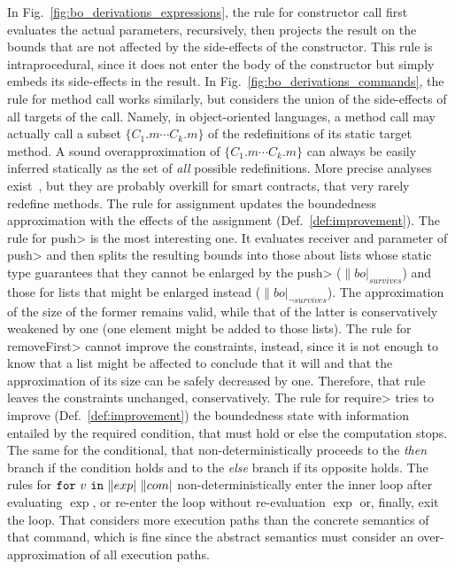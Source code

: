 %
In Fig.~\ref{fig:bo_derivations_expressions}, the
rule for constructor call first evaluates
the actual parameters, recursively, then projects the result on the bounds
that are not affected by the side-effects of the constructor. This
rule is intraprocedural, since it does not enter the body of the constructor
but simply embeds its side-effects in the result.
In Fig.~\ref{fig:bo_derivations_commands}, the rule for method call
works similarly, but considers the
union of the side-effects of all targets of the call.
Namely, in object-oriented languages, a method call may actually call a subset
$\{C_1.m\cdots C_k.m\}$ of the redefinitions of its static target method.
A sound overapproximation of $\{C_1.m\cdots C_k.m\}$
can always be easily inferred statically as the set of \emph{all} possible
redefinitions. More precise analyses exist~\cite{TipP00},
but they are probably overkill for smart contracts, that very rarely redefine methods.
The rule for assignment
updates the boundedness approximation with the effects of the assignment
(Def.~\ref{def:improvement}). The rule for \<push> is the most interesting one.
It evaluates receiver and parameter of \<push> and then splits the
resulting bounds into those about lists whose static type guarantees that
they cannot be enlarged by the \<push> ($\|bo|_{\mathit{survives}}$)
and those for lists that might be enlarged instead
($\|bo|_{\neg\mathit{survives}}$). The approximation of the size
of the former remains valid, while that of the latter is conservatively
weakened by one (one element might be added to those lists).
The rule for \<removeFirst> cannot improve the constraints, instead,
since it is not enough to know that a list might be affected to conclude
that it will and that the approximation of its size can be
safely decreased by one. Therefore, that rule leaves the constraints unchanged,
conservatively.
The rule for \<require> tries to improve
(Def.~\ref{def:improvement}) the boundedness state
with information entailed by the required condition, that must hold or
else the computation stops. The
same for the conditional, that non-deterministically proceeds
to the \emph{then} branch if the condition holds and to the \emph{else} branch
if its opposite holds. The rules for $\for{v}{\exp}{\com}$
non-deterministically enter the inner loop after evaluating $\exp$, or re-enter the
loop without re-evaluation $\exp$ or, finally, exit the loop. That
considers more execution paths than the concrete semantics
of that command, which is fine since the abstract semantics must consider
an over-approximation of all execution paths.

